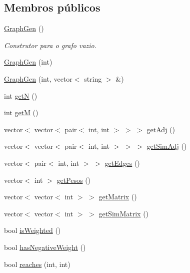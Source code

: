 \subsection*{Membros públicos}
\begin{DoxyCompactItemize}
\item 
\mbox{\label{classGraphGen_a71eb825043c2518df1be9a0ccef36bcb}} 
\mbox{\hyperlink{classGraphGen_a71eb825043c2518df1be9a0ccef36bcb}{Graph\+Gen}} ()
\begin{DoxyCompactList}\small\item\em Construtor para o grafo vazio. \end{DoxyCompactList}\item 
\mbox{\hyperlink{classGraphGen_aec08708894158ba3098873e7a1da6b60}{Graph\+Gen}} (int)
\item 
\mbox{\hyperlink{classGraphGen_abdb70c362c414ff5a18ab3796126a1a9}{Graph\+Gen}} (int, vector$<$ string $>$ \&)
\item 
int \mbox{\hyperlink{classGraphGen_a7447dc2fdc4cd3f86579811febfff1ad}{getN}} ()
\item 
int \mbox{\hyperlink{classGraphGen_aad12bcf774a0fa97150b01126d3a3e90}{getM}} ()
\item 
vector$<$ vector$<$ pair$<$ int, int $>$ $>$ $>$ \mbox{\hyperlink{classGraphGen_a36741424a266249c915f29fbab96175c}{get\+Adj}} ()
\item 
vector$<$ vector$<$ pair$<$ int, int $>$ $>$ $>$ \mbox{\hyperlink{classGraphGen_ab37943d4526c45711622796c84e983ac}{get\+Sim\+Adj}} ()
\item 
vector$<$ pair$<$ int, int $>$ $>$ \mbox{\hyperlink{classGraphGen_af140b74e5bbb7171a0b76f73d10c14ae}{get\+Edges}} ()
\item 
vector$<$ int $>$ \mbox{\hyperlink{classGraphGen_a56cb589bfd48135fe224d172dbed3155}{get\+Pesos}} ()
\item 
vector$<$ vector$<$ int $>$ $>$ \mbox{\hyperlink{classGraphGen_a32029b7e5e2c379bdc5412f0e954e121}{get\+Matrix}} ()
\item 
vector$<$ vector$<$ int $>$ $>$ \mbox{\hyperlink{classGraphGen_ab2f8872fc9fab4268ad999dd89e1d4fa}{get\+Sim\+Matrix}} ()
\item 
bool \mbox{\hyperlink{classGraphGen_aa0069b56cfa3e2d7d596bda9ba4ccc2b}{is\+Weighted}} ()
\item 
bool \mbox{\hyperlink{classGraphGen_a904cd0ab02e4c837ebd85226996fb4b2}{has\+Negative\+Weight}} ()
\item 
bool \mbox{\hyperlink{classGraphGen_a4fba74f3a12a3153843f550569981b0b}{reaches}} (int, int)

\end{DoxyCompactItemize}
